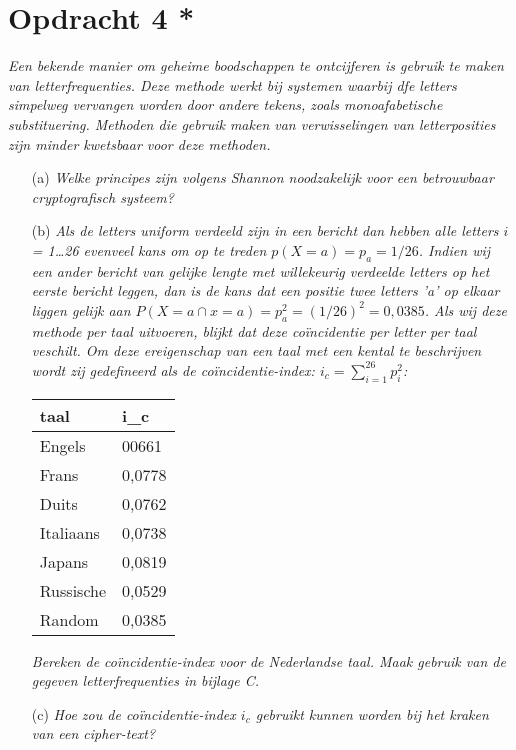 \section{Opdracht 4 *}
\emph{Een bekende manier om geheime boodschappen te ontcijferen is gebruik te maken van letterfrequenties. Deze methode werkt bij systemen waarbij dfe letters simpelweg vervangen worden door andere tekens, zoals monoafabetische substituering. Methoden die gebruik maken van verwisselingen van letterposities zijn minder kwetsbaar voor deze methoden.}

\begin{itemize}
  \item[(a)] \emph{Welke principes zijn volgens Shannon noodzakelijk voor een betrouwbaar cryptografisch systeem?}
  \item[(b)] \emph{Als de letters uniform verdeeld zijn in een bericht dan hebben alle letters $i$ = 1\ldots26 evenveel kans om op te treden $p(X=a)=p_a=1/26$. Indien wij een ander bericht van gelijke lengte met willekeurig verdeelde letters op het eerste bericht leggen, dan is de kans dat een positie twee letters 'a' op elkaar liggen gelijk aan $P(X=a\cap x = a)=p_a^2=(1/26)^2=0,0385$. Als wij deze methode per taal uitvoeren, blijkt dat deze co\"{i}ncidentie per letter per taal veschilt. Om deze ereigenschap van een taal met een kental te beschrijven wordt zij gedefineerd als de \emph{co\"{i}ncidentie-index}: $i_c=\sum ^{26}_{i=1} p^2_i$:}

\begin{center}
\begin{tabular}{ll}
  taal & i_c \\
  \hline
  Engels & 00661 \\ 
  Frans & 0,0778 \\
  Duits & 0,0762 \\
  Italiaans & 0,0738 \\
  Japans & 0,0819 \\
  Russische & 0,0529 \\
  Random & 0,0385 \\
\end{tabular}
\end{center}

\emph{Bereken de co\"{i}ncidentie-index voor de Nederlandse taal. Maak gebruik van de gegeven letterfrequenties in bijlage C.}
   \item[(c)] \emph{Hoe zou de co\"{i}ncidentie-index $i_c$ gebruikt kunnen worden bij het kraken van een cipher-text?}
\end{itemize}

